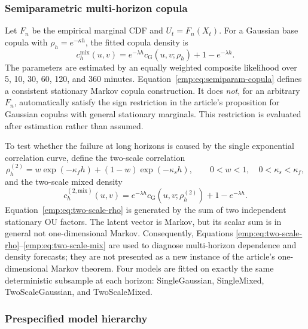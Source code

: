 \documentclass[11pt]{article}
\newcommand{\1}{\mathbf{1}}
\begin{document}
\subsubsection{Semiparametric multi-horizon copula}

Let $F_n$ be the empirical marginal CDF and $U_t=F_n(X_t)$.  For a Gaussian base
copula with $\rho_h=e^{-\kappa h}$, the fitted copula density is
\begin{equation}
c_h^{\mathrm{mix}}(u,v)
=e^{-\lambda h}c_{\mathrm{G}}(u,v;\rho_h)
+1-e^{-\lambda h}.
\label{emp:eq:semiparam-copula}
\end{equation}
The parameters are estimated by an equally weighted composite likelihood over
5, 10, 30, 60, 120, and 360 minutes.  Equation~\eqref{emp:eq:semiparam-copula}
defines a consistent stationary Markov copula construction.  It does
\emph{not}, for an arbitrary $F_n$, automatically satisfy the sign restriction
in the article's proposition for Gaussian copulas with general stationary
marginals.  This restriction is evaluated after estimation rather than assumed.

To test whether the failure at long horizons is caused by the single exponential
correlation curve, define the two-scale correlation
\begin{equation}
 \rho_h^{(2)}=w\exp(-\kappa_{f}h)+(1-w)\exp(-\kappa_{s}h),
 \qquad 0<w<1,\quad 0<\kappa_s<\kappa_f,
 \label{emp:eq:two-scale-rho}
\end{equation}
and the two-scale mixed density
\begin{equation}
 c_{h}^{(2,\mathrm{mix})}(u,v)
 =e^{-\lambda h}c_{\mathrm G}(u,v;\rho_h^{(2)})+1-e^{-\lambda h}.
 \label{emp:eq:two-scale-mix}
\end{equation}
Equation~\eqref{emp:eq:two-scale-rho} is generated by the sum of two independent
stationary OU factors.  The latent vector is Markov, but its scalar sum is in
general not one-dimensional Markov.  Consequently, Equations
\eqref{emp:eq:two-scale-rho}--\eqref{emp:eq:two-scale-mix} are used to diagnose
multi-horizon dependence and density forecasts; they are not presented as a new
instance of the article's one-dimensional Markov theorem.  Four models are fitted
on exactly the same deterministic subsample at each horizon: SingleGaussian,
SingleMixed, TwoScaleGaussian, and TwoScaleMixed.

\subsubsection{Prespecified model hierarchy}
\end{document}
